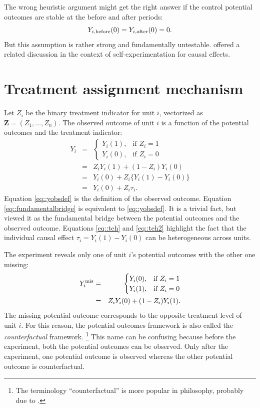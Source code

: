The wrong heuristic argument might get the right answer if the control potential outcomes are stable at the before and after periods: 
$$
Y_{i,\textup{before}}(0) = Y_{i,\textup{after}}(0) = 0 .
$$ 
But this assumption is rather strong and fundamentally untestable. \citet{rubin2001comment} offered a related discussion in the context of self-experimentation for causal effects.



\section{Treatment assignment mechanism}\label{sec::Treatment-ScienceTable}

Let $Z_i$ be the binary treatment indicator for unit $i$, vectorized as $\bm{Z} = (Z_1, \ldots, Z_n)$. The observed outcome of unit $i$ is a function of the potential outcomes and the treatment indicator: 
\begin{eqnarray} 
Y_i &=& \begin{cases}
   Y_i(1),& \text{if } Z_i = 1\\
   Y_i(0), & \text{if } Z_i = 0
\end{cases} \label{eq::yobsdef} \\
&=& Z_i Y_i(1) + (1-Z_i)Y_i(0) \label{eq::fundamentalbridge} \\
&=& Y_i(0)  + Z_i\{  Y_i(1) - Y_i(0)  \} \label{eq::teh} \\
&=&Y_i(0)  + Z_i\tau_i . \label{eq::teh2} 
\end{eqnarray}  
Equation \eqref{eq::yobsdef} is the definition of the observed outcome. Equation \eqref{eq::fundamentalbridge} is equivalent to \eqref{eq::yobsdef}. It is a trivial fact, but \citet{pearl2010brief} viewed it as the fundamental bridge between the potential outcomes and the observed outcome. Equations \eqref{eq::teh} and  \eqref{eq::teh2}  highlight the fact that the individual causal effect $\tau_i =  Y_i(1) - Y_i(0)  $ can be heterogeneous across units. 


The experiment reveals only one of unit $i$'s potential outcomes with the other one missing:
\begin{eqnarray*} 
Y_i^\textup{mis} &=& \begin{cases}
   Y_i(0),& \text{if } Z_i = 1\\
   Y_i(1), & \text{if } Z_i = 0
\end{cases}  \\
&=& Z_i Y_i(0) + (1-Z_i)Y_i(1) .
\end{eqnarray*}  
The missing potential outcome corresponds to the opposite treatment level of unit $i$. For this reason, the potential outcomes framework is also called the {\it counterfactual} framework.  \footnote{The terminology ``counterfactual'' is more popular in philosophy, probably due to \citet{lewis1973causation}. }
This name can be confusing because before the experiment, both the potential outcomes can be observed. Only after the experiment, one potential outcome is observed whereas the other potential outcome is counterfactual. 


